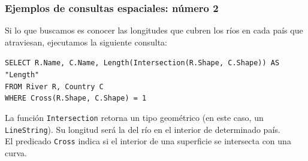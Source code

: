 \begin{frame}
\frametitle{Ejemplos de consultas espaciales: número 2}
	Si lo que buscamos es conocer las longitudes que cubren los ríos en cada país que atraviesan,
	ejecutamos la siguiente consulta:
	\medskip
	\pause

	\texttt{SELECT R.Name, C.Name, Length(Intersection(R.Shape, C.Shape)) AS "Length" \\
			FROM River R, Country C \\
			WHERE Cross(R.Shape, C.Shape) = 1
	}

	\medskip
	\pause

	La función \texttt{Intersection} retorna un tipo geométrico (en este caso,
	un \texttt{LineString}). Su longitud será la del río en el interior de determinado país. \\
	El predicado \texttt{Cross} indica si el interior de una superficie se intersecta
	con una curva.
\end{frame}
